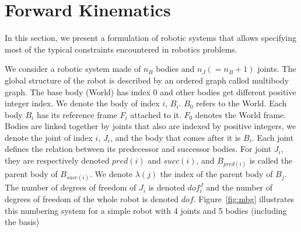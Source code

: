 



\section{Forward Kinematics}
\label{sec:forward_kinematics}


In this section, we present a formulation of robotic systems that allows specifying most of the typical constraints encountered in robotics problems.

We consider a robotic system made of $n_B$ bodies and $n_J(=n_B+1)$ joints.
The global structure of the robot is described by an ordered graph called multibody graph.
The base body (World) has index $0$ and other bodies get different positive integer index.
We denote the body of index $i$, $B_i$.
$B_0$ refers to the World.
Each body $B_i$ has its reference frame $F_i$ attached to it.
$F_0$ denotes the World frame.
Bodies are linked together by joints that also are indexed by positive integers, we denote the joint of index $i$, $J_i$, and the body that comes after it is $B_i$.
Each joint defines the relation between its predecessor and successor bodies.
For joint $J_i$, they are respectively denoted $pred(i)$ and $succ(i)$, and $B_{pred(i)}$ is called the parent body of $B_{succ(i)}$.
We denote $\lambda(j)$ the index of the parent body of $B_j$.
The number of degrees of freedom of $J_i$ is denoted $dof^J_i$ and the number of degrees of freedom of the whole robot is denoted $dof$.
Figure~\ref{fig:mbg} illustrates this numbering system for a simple robot with 4 joints and 5 bodies (including the basis)

